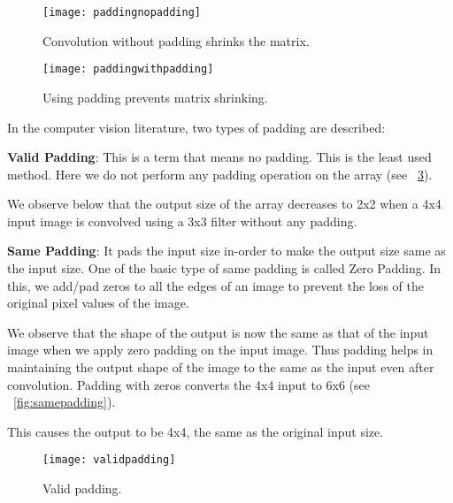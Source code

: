 	\begin{figure}[h]
		\centering
		\texttt{[image: paddingnopadding]}
		\caption[Convolution without padding shrinks the matrix]{Convolution without padding shrinks the matrix.}
		\label{fig:paddingnopadding}
	\end{figure}
	\begin{figure}[h]
		\centering
		\texttt{[image: paddingwithpadding]}
		\caption[Using padding prevents matrix shrinking]{Using padding prevents matrix shrinking.}
		\label{fig:paddingwithpadding}
	\end{figure}

In the computer vision literature, two types of padding are described:
	\begin{bulletedlist}
		\item {\bfseries Valid Padding}: This is a term that means no padding.  This is the least used method.  Here we do not perform any padding operation on the array (see \figurename~\ref{fig:validpadding}).
		\begin{bulletedlist}
			\item We observe below that the output size of the array decreases to 2x2 when a 4x4 input image is convolved using a 3x3 filter without any padding.
		\end{bulletedlist}
		\item {\bfseries Same Padding}: It pads the input size in-order to make the output size same as the input size.  One of the basic type of same padding is called Zero Padding. In this, we add/pad zeros to all the edges of an image to prevent the loss of the original pixel values of the image.
		\begin{bulletedlist}
			\item We observe that the shape of the output is now the same as that of the input image when we apply zero padding on the input image. Thus padding helps in maintaining the output shape of the image to the same as the input even after convolution.
Padding with zeros converts the 4x4 input to 6x6 (see \figurename~\ref{fig:samepadding}).
			\item This causes the output to be 4x4, the same as the original input size.
		\end{bulletedlist}
	\end{bulletedlist}

	\begin{figure}[h]
		\centering
		\texttt{[image: validpadding]}
		\caption[Valid padding]{Valid padding.}
		\label{fig:validpadding}
	\end{figure}

